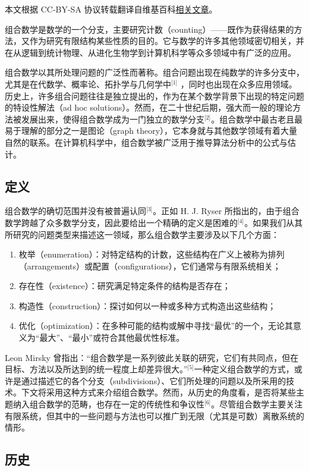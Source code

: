 
本文根据 CC-BY-SA 协议转载翻译自维基百科\href{https://en.wikipedia.org/wiki/Combinatorics}{相关文章}。

组合数学是数学的一个分支，主要研究计数（counting）——既作为获得结果的方法，又作为研究有限结构某些性质的目的。它与数学的许多其他领域密切相关，并在从逻辑到统计物理、从进化生物学到计算机科学等众多领域中有广泛的应用。

组合数学以其所处理问题的广泛性而著称。组合问题出现在纯数学的许多分支中，尤其是在代数学、概率论、拓扑学与几何学中\(^\text{[1]}\) ，同时也出现在众多应用领域。  
历史上，许多组合问题往往是独立提出的，作为在某个数学背景下出现的特定问题的特设性解法（ad hoc solutions）。然而，在二十世纪后期，强大而一般的理论方法被发展出来，使得组合数学成为一门独立的数学分支\(^\text{[2]}\)。组合数学中最古老且最易于理解的部分之一是图论（graph theory），它本身就与其他数学领域有着大量自然的联系。在计算机科学中，组合数学被广泛用于推导算法分析中的公式与估计。
\subsection{定义}
组合数学的确切范围并没有被普遍认同\(^\text{[3]}\)。正如 H. J. Ryser 所指出的，由于组合数学跨越了众多数学分支，因此要给出一个精确的定义是困难的\(^\text{[4]}\)。如果我们从其所研究的问题类型来描述这一领域，那么组合数学主要涉及以下几个方面：
\begin{enumerate}
  \item 枚举（enumeration）：对特定结构的计数，这些结构在广义上被称为排列（arrangements）或配置（configurations），它们通常与有限系统相关；
  \item 存在性（existence）：研究满足特定条件的结构是否存在；
  \item 构造性（construction）：探讨如何以一种或多种方式构造出这些结构；
  \item 优化（optimization）：在多种可能的结构或解中寻找“最优”的一个，无论其意义为“最大”、“最小”或符合其他最优性标准。
\end{enumerate}
Leon Mirsky 曾指出：“组合数学是一系列彼此关联的研究，它们有共同点，但在目标、方法以及所达到的统一程度上却差异很大。”\(^\text{[5]}\)一种定义组合数学的方式，或许是通过描述它的各个分支（subdivisions）、它们所处理的问题以及所采用的技术。下文将采用这种方式来介绍组合数学。然而，从历史的角度看，是否将某些主题纳入组合数学的范畴，也存在一定的传统性和争议性\(^\text{[6]}\)。尽管组合数学主要关注有限系统，但其中的一些问题与方法也可以推广到无限（尤其是可数）离散系统的情形。
\subsection{历史}

